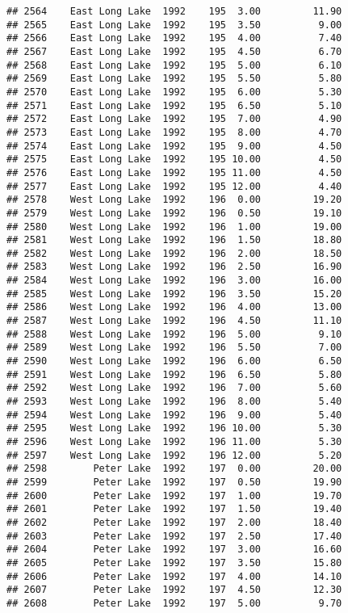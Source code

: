 \documentclass[
]{article}
\begin{document}
\begin{verbatim}
## 2564    East Long Lake  1992    195  3.00         11.90
## 2565    East Long Lake  1992    195  3.50          9.00
## 2566    East Long Lake  1992    195  4.00          7.40
## 2567    East Long Lake  1992    195  4.50          6.70
## 2568    East Long Lake  1992    195  5.00          6.10
## 2569    East Long Lake  1992    195  5.50          5.80
## 2570    East Long Lake  1992    195  6.00          5.30
## 2571    East Long Lake  1992    195  6.50          5.10
## 2572    East Long Lake  1992    195  7.00          4.90
## 2573    East Long Lake  1992    195  8.00          4.70
## 2574    East Long Lake  1992    195  9.00          4.50
## 2575    East Long Lake  1992    195 10.00          4.50
## 2576    East Long Lake  1992    195 11.00          4.50
## 2577    East Long Lake  1992    195 12.00          4.40
## 2578    West Long Lake  1992    196  0.00         19.20
## 2579    West Long Lake  1992    196  0.50         19.10
## 2580    West Long Lake  1992    196  1.00         19.00
## 2581    West Long Lake  1992    196  1.50         18.80
## 2582    West Long Lake  1992    196  2.00         18.50
## 2583    West Long Lake  1992    196  2.50         16.90
## 2584    West Long Lake  1992    196  3.00         16.00
## 2585    West Long Lake  1992    196  3.50         15.20
## 2586    West Long Lake  1992    196  4.00         13.00
## 2587    West Long Lake  1992    196  4.50         11.10
## 2588    West Long Lake  1992    196  5.00          9.10
## 2589    West Long Lake  1992    196  5.50          7.00
## 2590    West Long Lake  1992    196  6.00          6.50
## 2591    West Long Lake  1992    196  6.50          5.80
## 2592    West Long Lake  1992    196  7.00          5.60
## 2593    West Long Lake  1992    196  8.00          5.40
## 2594    West Long Lake  1992    196  9.00          5.40
## 2595    West Long Lake  1992    196 10.00          5.30
## 2596    West Long Lake  1992    196 11.00          5.30
## 2597    West Long Lake  1992    196 12.00          5.20
## 2598        Peter Lake  1992    197  0.00         20.00
## 2599        Peter Lake  1992    197  0.50         19.90
## 2600        Peter Lake  1992    197  1.00         19.70
## 2601        Peter Lake  1992    197  1.50         19.40
## 2602        Peter Lake  1992    197  2.00         18.40
## 2603        Peter Lake  1992    197  2.50         17.40
## 2604        Peter Lake  1992    197  3.00         16.60
## 2605        Peter Lake  1992    197  3.50         15.80
## 2606        Peter Lake  1992    197  4.00         14.10
## 2607        Peter Lake  1992    197  4.50         12.30
## 2608        Peter Lake  1992    197  5.00          9.70

\end{verbatim}
\end{document}
